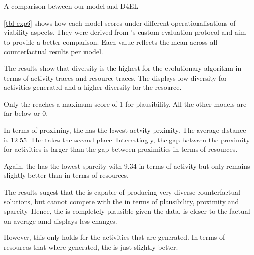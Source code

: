 \documentclass[./../../paper.tex]{subfiles}
\begin{document}
\begin{table}
    \centering    
    \resizebox{\linewidth}{!}{
        
        
    }
\caption{A comparison between our model and D4EL}
\label{tbl-exp6}
\end{table}

\autoref{tbl-exp6} shows how each model scores under different operationalisations of viability aspects. They were derived from \citeauthor{hsieh_DiCE4ELInterpretingProcess_2021}'s custom evaluation protocol and aim to provide a better comparison. Each value reflects the mean across all counterfactual results per model.




The results show that diversity is the highest for the evolutionary algorithm in terms of activity traces and resource traces. The \ModelRNG displays low diversity for activities generated and a higher diversity for the resource. 

Only the \ModelCBG reaches a maximum score of 1 for plausibility. All the other models are far below or 0. 

In terms of proximiny, the \ModelCBG has the lowest actvity prximity. The average distance is 12.55. The \ModelEVOFSR takes the second place. Interestingly, the gap between the proximity for activities is larger than the gap between proximities in terms of resources.

Again, the \ModelCBG has the lowest sparcity with 9.34 in terms of activity but only remains slightly better than \ModelEVOFSR in terms of resources. 

The results sugest that the \ModelEVOFSR is capable of producing very diverse counterfactual solutions, but cannot compete with the \ModelCBG in terms of plausibility, proximity and sparcity. Hence, the \ModelCBG is completely plausible given the data, is closer to the factual on average amd displays less changes.

However, this only holds for the activities that are generated.  In terms of resources that where generated, the \ModelCBG is just slightly better.
\end{document}
